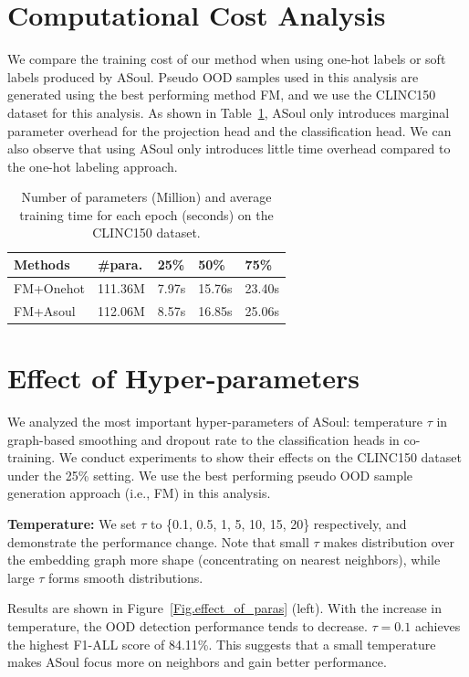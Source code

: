 \documentclass[11pt]{article}
\begin{document}
\section{Computational Cost Analysis}\label{append:comp}
We compare the training cost of our method when using one-hot labels or soft labels produced by ASoul.
Pseudo OOD samples used in this analysis are generated using the best performing method FM, and we use the CLINC150 dataset for this analysis. As shown in Table~\ref{tab:efficiency}, ASoul only introduces marginal parameter overhead for the projection head and the classification head. We can also observe that using ASoul only introduces little time overhead compared to the one-hot labeling approach.

\begin{table}[htbp]
\begin{center}
\small
\begin{tabular}{ l | l | l |l| l } 
\toprule
   Methods & \#para. & 25\%  & 50\%  & 75\% \\ 
\midrule
  FM+Onehot & 111.36M & 7.97s & 15.76s & 23.40s \\
  FM+Asoul & 112.06M & 8.57s & 16.85s & 25.06s \\
\bottomrule
\end{tabular}
\end{center}
\caption{Number of parameters (Million) and average training
time for each epoch (seconds) on the CLINC150 dataset.}
\label{tab:efficiency}
\end{table}

\section{Effect of Hyper-parameters}\label{append:hyper_sen}

We analyzed the most important hyper-parameters of ASoul: temperature $\tau$ in graph-based smoothing and dropout rate to the classification heads in co-training. We conduct experiments to show their effects on the CLINC150 dataset under the 25\% setting. We use the best performing pseudo OOD sample generation approach (i.e., FM) in this analysis.

\noindent\textbf{Temperature:} We set $\tau$ to \{0.1, 0.5, 1, 5, 10, 15, 20\} respectively, and demonstrate the performance change. Note that small $\tau$ makes distribution over the embedding graph more shape (concentrating on nearest neighbors), while large $\tau$ forms smooth distributions.

Results are shown in Figure~\ref{Fig.effect_of_paras} (left). With the increase in temperature, the OOD detection performance tends to decrease. $\tau=0.1$ achieves the highest F1-ALL score of 84.11\%. This suggests that a small temperature makes ASoul focus more on neighbors and gain better performance.
\end{document}
